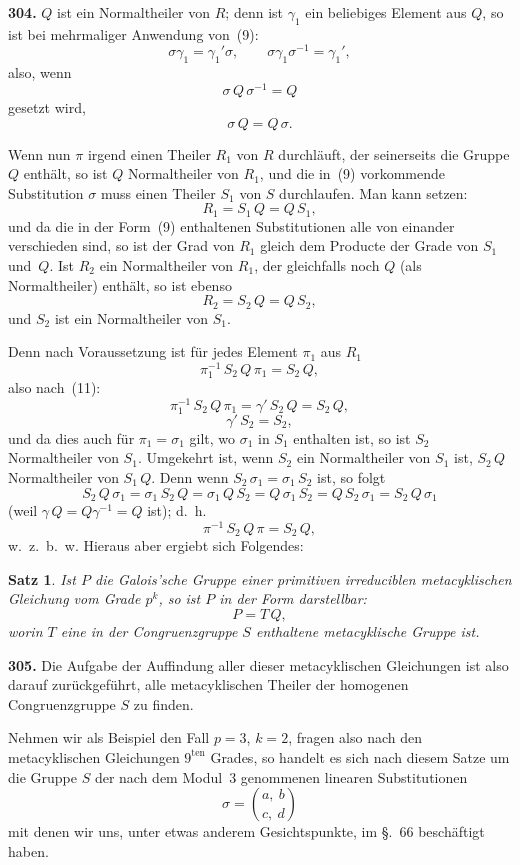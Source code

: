 \documentclass[12pt,a4paper]{article}
\newtheorem*{satz}{Satz}
\begin{document}
\bigskip
\noindent\textbf{304.} $Q$ ist ein Normaltheiler von $R$; denn ist $\gamma_1$ ein beliebiges Element aus $Q$, so ist bei mehrmaliger Anwendung von~(9):
\[
\sigma\gamma_1 = \gamma_1'\sigma,\qquad \sigma\gamma_1\sigma^{-1} = \gamma_1',
\]
also, wenn
\[
\sigma\,Q\,\sigma^{-1} = Q
\]
gesetzt wird,
\begin{equation}
\tag{11}
\sigma\,Q = Q\,\sigma.
\end{equation}

Wenn nun $\pi$ irgend einen Theiler $R_1$ von $R$ durchl\"auft, der seinerseits die Gruppe $Q$ enth\"alt, so ist $Q$ Normaltheiler von $R_1$, und die in~(9) vorkommende Substitution $\sigma$ muss einen Theiler $S_1$ von $S$ durchlaufen. Man kann setzen:
\[
R_1 = S_1\,Q = Q\,S_1,
\]
und da die in der Form~(9) enthaltenen Substitutionen alle von einander verschieden sind, so ist der Grad von $R_1$ gleich dem Producte der Grade von $S_1$ und~$Q$. Ist $R_2$ ein Normaltheiler von $R_1$, der gleichfalls noch $Q$ (als Normaltheiler) enth\"alt, so ist ebenso
\[
R_2 = S_2\,Q = Q\,S_2,
\]
und $S_2$ ist ein Normaltheiler von $S_1$.

Denn nach Voraussetzung ist f\"ur jedes Element $\pi_1$ aus $R_1$
\[
\pi_1^{-1}\,S_2\,Q\,\pi_1 = S_2\,Q,
\]
also nach~(11):
\[
\pi_1^{-1}\,S_2\,Q\,\pi_1 = \gamma'\,S_2\,Q = S_2\,Q,
\]
\[
\gamma'\,S_2 = S_2,
\]
und da dies auch f\"ur $\pi_1=\sigma_1$ gilt, wo $\sigma_1$ in $S_1$ enthalten ist, so ist $S_2$ Normaltheiler von $S_1$. Umgekehrt ist, wenn $S_2$ ein Normaltheiler von $S_1$ ist, $S_2\,Q$ Normaltheiler von $S_1\,Q$. Denn wenn $S_2\,\sigma_1 = \sigma_1\,S_2$ ist, so folgt
\[
S_2\,Q\,\sigma_1 = \sigma_1\,S_2\,Q = \sigma_1\,Q\,S_2 = Q\,\sigma_1\,S_2 = Q\,S_2\,\sigma_1 = S_2\,Q\,\sigma_1
\]
(weil $\gamma\,Q = Q\gamma^{-1} = Q$ ist); d.~h.
\[
\pi^{-1}\,S_2\,Q\,\pi = S_2\,Q,
\]
w.~z.~b.~w. Hieraus aber ergiebt sich Folgendes:

\begin{satz}
Ist $P$ die Galois'sche Gruppe einer primitiven irreduciblen metacyklischen Gleichung vom Grade $p^k$, so ist $P$ in der Form darstellbar:
\[
P = T\,Q,
\]
worin $T$ eine in der Congruenzgruppe $S$ enthaltene metacyklische Gruppe ist.
\end{satz}

\bigskip
\noindent\textbf{305.} Die Aufgabe der Auffindung aller dieser metacyklischen Gleichungen ist also darauf zur\"uckgef\"uhrt, alle metacyklischen Theiler der homogenen Congruenzgruppe $S$ zu finden.

Nehmen wir als Beispiel den Fall $p=3$, $k=2$, fragen also nach den metacyklischen Gleichungen $9^{\text{ten}}$ Grades, so handelt es sich nach diesem Satze um die Gruppe $S$ der nach dem Modul~3 genommenen linearen Substitutionen
\begin{equation}
\tag{12}
\sigma = \binom{a,\ b}{c,\ d}
\end{equation}
mit denen wir uns, unter etwas anderem Gesichtspunkte, im \S.~66 besch\"aftigt haben.
\end{document}
